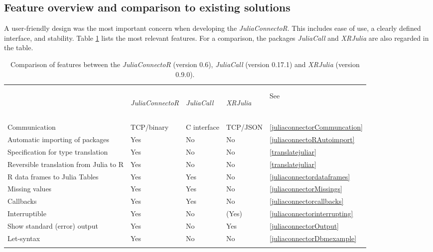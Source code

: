 \documentclass[12pt]{article}
\newcommand{\apkg}[1]{\emph{#1}}
\newcommand{\proglang}[1]{#1} %
\begin{document}
\subsection{Feature overview and comparison to existing solutions}
A user-friendly design was the most important concern when developing the \apkg{JuliaConnectoR}.
This includes ease of use, a clearly defined interface, and stability.
Table \ref{tab:JuliaConnectoRFeatures} lists the most relevant features.
For a comparison, the packages \apkg{JuliaCall} and \apkg{XRJulia} are also regarded in the table.

\begin{table}[h!]
\centering
\caption{\label{tab:JuliaConnectoRFeatures} Comparison of features between the
\apkg{JuliaConnectoR} (version 0.6), \apkg{JuliaCall} (version 0.17.1) and
\apkg{XRJulia} (version 0.9.0).}
\begin{tabular}{p{6.75cm} p{1.9cm} p{2.05cm} p{2cm} p{1.2cm}}
\hline \\ [2ex]\\
 & \begin{rotate}{25}\apkg{JuliaConnectoR} \end{rotate} &
 \begin{rotate}{25} \apkg{JuliaCall} \end{rotate} &
 \begin{rotate}{25} \apkg{XRJulia} \end{rotate} &
 See \\
\hline 
\\\\[-4\medskipamount]
Communication & TCP/binary & \proglang{C} interface & TCP/JSON &
\ref{juliaconnectorCommuncation} \\
Automatic importing of packages & Yes & No & No &
\ref{juliaconnectoRAutoimport} \\
Specification for type translation & Yes & No & No &
\ref{translatejuliar} \\
Reversible translation from Julia to R & Yes
& No & No & \ref{translatejuliar} \\
\proglang{R} data frames to \proglang{Julia} Tables & Yes & Yes & No &
\ref{juliaconnectordataframes} \\
Missing values & Yes & Yes & No & \ref{juliaconnectorMissings} \\
Callbacks & Yes & Yes & No & \ref{juliaconnectorcallbacks} \\
Interruptible & Yes & No & (Yes) & \ref{juliaconnectorinterrupting} \\
Show standard (error) output & Yes & No & Yes &
\ref{juliaconnectorOutput} \\
Let-syntax & Yes & No & No & \ref{juliaconnectorDbmexample} \\
\\[-2\medskipamount]
\hline
\end{tabular}
\end{table}
\end{document}
